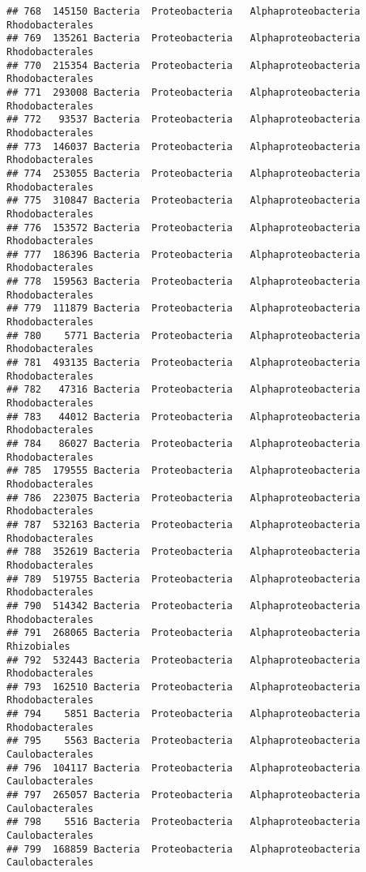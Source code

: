 \documentclass[
]{article}
\begin{document}
\begin{verbatim}
## 768  145150 Bacteria  Proteobacteria   Alphaproteobacteria     Rhodobacterales
## 769  135261 Bacteria  Proteobacteria   Alphaproteobacteria     Rhodobacterales
## 770  215354 Bacteria  Proteobacteria   Alphaproteobacteria     Rhodobacterales
## 771  293008 Bacteria  Proteobacteria   Alphaproteobacteria     Rhodobacterales
## 772   93537 Bacteria  Proteobacteria   Alphaproteobacteria     Rhodobacterales
## 773  146037 Bacteria  Proteobacteria   Alphaproteobacteria     Rhodobacterales
## 774  253055 Bacteria  Proteobacteria   Alphaproteobacteria     Rhodobacterales
## 775  310847 Bacteria  Proteobacteria   Alphaproteobacteria     Rhodobacterales
## 776  153572 Bacteria  Proteobacteria   Alphaproteobacteria     Rhodobacterales
## 777  186396 Bacteria  Proteobacteria   Alphaproteobacteria     Rhodobacterales
## 778  159563 Bacteria  Proteobacteria   Alphaproteobacteria     Rhodobacterales
## 779  111879 Bacteria  Proteobacteria   Alphaproteobacteria     Rhodobacterales
## 780    5771 Bacteria  Proteobacteria   Alphaproteobacteria     Rhodobacterales
## 781  493135 Bacteria  Proteobacteria   Alphaproteobacteria     Rhodobacterales
## 782   47316 Bacteria  Proteobacteria   Alphaproteobacteria     Rhodobacterales
## 783   44012 Bacteria  Proteobacteria   Alphaproteobacteria     Rhodobacterales
## 784   86027 Bacteria  Proteobacteria   Alphaproteobacteria     Rhodobacterales
## 785  179555 Bacteria  Proteobacteria   Alphaproteobacteria     Rhodobacterales
## 786  223075 Bacteria  Proteobacteria   Alphaproteobacteria     Rhodobacterales
## 787  532163 Bacteria  Proteobacteria   Alphaproteobacteria     Rhodobacterales
## 788  352619 Bacteria  Proteobacteria   Alphaproteobacteria     Rhodobacterales
## 789  519755 Bacteria  Proteobacteria   Alphaproteobacteria     Rhodobacterales
## 790  514342 Bacteria  Proteobacteria   Alphaproteobacteria     Rhodobacterales
## 791  268065 Bacteria  Proteobacteria   Alphaproteobacteria         Rhizobiales
## 792  532443 Bacteria  Proteobacteria   Alphaproteobacteria     Rhodobacterales
## 793  162510 Bacteria  Proteobacteria   Alphaproteobacteria     Rhodobacterales
## 794    5851 Bacteria  Proteobacteria   Alphaproteobacteria     Rhodobacterales
## 795    5563 Bacteria  Proteobacteria   Alphaproteobacteria     Caulobacterales
## 796  104117 Bacteria  Proteobacteria   Alphaproteobacteria     Caulobacterales
## 797  265057 Bacteria  Proteobacteria   Alphaproteobacteria     Caulobacterales
## 798    5516 Bacteria  Proteobacteria   Alphaproteobacteria     Caulobacterales
## 799  168859 Bacteria  Proteobacteria   Alphaproteobacteria     Caulobacterales

\end{verbatim}
\end{document}
